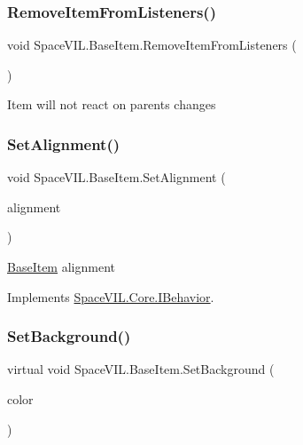 \subsubsection{\texorpdfstring{Remove\+Item\+From\+Listeners()}{RemoveItemFromListeners()}}
{\footnotesize\ttfamily void Space\+V\+I\+L.\+Base\+Item.\+Remove\+Item\+From\+Listeners (\begin{DoxyParamCaption}{ }\end{DoxyParamCaption})}



Item will not react on parent\textquotesingle{}s changes 

\mbox{\label{class_space_v_i_l_1_1_base_item_a2e307fb7749ddd02e3cf7489849be9f0}} 
\subsubsection{\texorpdfstring{Set\+Alignment()}{SetAlignment()}}
{\footnotesize\ttfamily void Space\+V\+I\+L.\+Base\+Item.\+Set\+Alignment (\begin{DoxyParamCaption}\item[{Item\+Alignment}]{alignment }\end{DoxyParamCaption})}



\mbox{\hyperlink{class_space_v_i_l_1_1_base_item}{Base\+Item}} alignment 



Implements \mbox{\hyperlink{interface_space_v_i_l_1_1_core_1_1_i_behavior}{Space\+V\+I\+L.\+Core.\+I\+Behavior}}.

\mbox{\label{class_space_v_i_l_1_1_base_item_a9ac74dbeeaedbc9dc13edbad28ee1d8c}} 
\subsubsection{\texorpdfstring{Set\+Background()}{SetBackground()}}
{\footnotesize\ttfamily virtual void Space\+V\+I\+L.\+Base\+Item.\+Set\+Background (\begin{DoxyParamCaption}\item[{Color}]{color }\end{DoxyParamCaption})\hspace{0.3cm}{\ttfamily [virtual]}}



